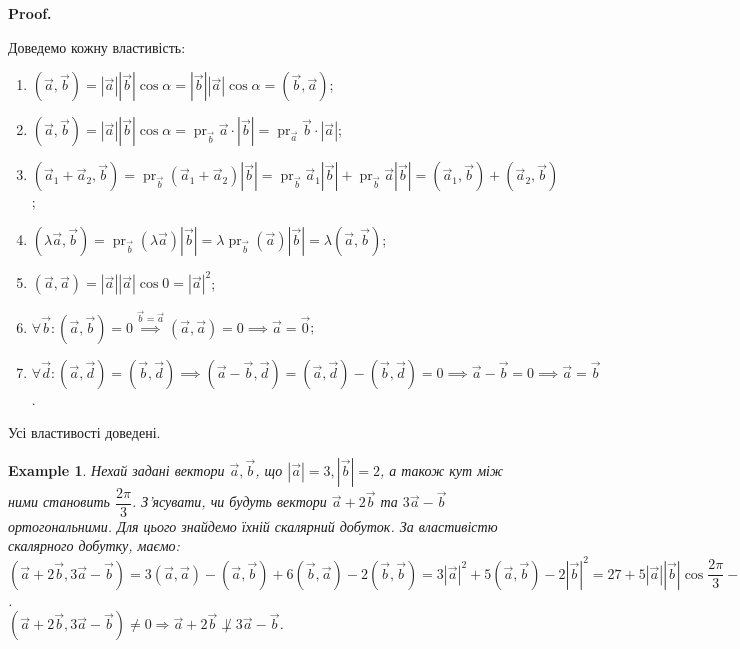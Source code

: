 \documentclass[a4paper, 10pt]{extarticle}
\makeatletter
\def\qed{$\blacksquare$}
\def\qed{$\blacksquare$}
\theoremstyle{theoremdd}
\theoremstyle{theoremdd}
\theoremstyle{theoremdd}
\theoremstyle{theoremdd}
\newtheorem{example}[theorem]{Example}
\theoremstyle{theoremdd}
\theoremstyle{theoremdd}
\theoremstyle{theoremdd}
\theoremstyle{theoremdd}
\renewenvironment{proof}[1][Proof.\\]{\par
\pushQED{\hfill \qed}%
\normalfont \topsep6\p@\@plus6\p@\relax
\trivlist
\item\relax
{\bfseries
#1\@addpunct{.}}\hspace\labelsep\ignorespaces
}{%
\popQED\endtrivlist\@endpefalse
}
\DeclareMathOperator{\pr}{pr}
\makeatother
\begin{document}
\begin{proof}
Доведемо кожну властивість:
\begin{enumerate}[wide=0pt,label={\arabic*)}]
	\item $(\vec{a}, \vec{b}) = |\vec{a}| |\vec{b}| \cos \alpha = |\vec{b}| |\vec{a}| \cos \alpha = (\vec{b}, \vec{a})$;
	\item $(\vec{a}, \vec{b}) = |\vec{a}| |\vec{b}| \cos \alpha = \pr_{\vec{b}} \vec{a} \cdot |\vec{b}| = \pr_{\vec{a}} \vec{b} \cdot |\vec{a}|$;
	\item $(\vec{a}_1+\vec{a}_2, \vec{b}) = \pr_{\vec{b}} (\vec{a}_1 + \vec{a}_2) |\vec{b}| = \pr_{\vec{b}} \vec{a}_1 |\vec{b}| + \pr_{\vec{b}} \vec{a} |\vec{b}| = (\vec{a}_1, \vec{b}) + (\vec{a}_2, \vec{b})$;
	\item $(\lambda \vec{a}, \vec{b}) = \pr_{\vec{b}} (\lambda \vec{a}) |\vec{b}| = \lambda \pr_{\vec{b}} (\vec{a}) |\vec{b}| = \lambda (\vec{a}, \vec{b})$;
	\item $(\vec{a}, \vec{a}) = |\vec{a}| |\vec{a}| \cos 0 = |\vec{a}|^2$;
	\item $\forall \vec{b}: (\vec{a}, \vec{b}) = 0 \overset{\vec{b} = \vec{a}}{\implies} (\vec{a}, \vec{a}) = 0 \implies \vec{a} = \vec{0}$;
	\item $\forall \vec{d}: (\vec{a}, \vec{d}) = (\vec{b}, \vec{d}) \implies (\vec{a}-\vec{b}, \vec{d}) = (\vec{a}, \vec{d}) - (\vec{b}, \vec{d}) = 0 \implies \vec{a} - \vec{b} = 0 \implies \vec{a} = \vec{b}$.
\end{enumerate}
Усі властивості доведені.
\end{proof}

\begin{example}
	Нехай задані вектори $\vec{a}, \vec{b}$, що $|\vec{a}| = 3, |\vec{b}| = 2$, а також кут між ними становить $\dfrac{2 \pi}{3}$. З'ясувати, чи будуть вектори $\vec{a}+2 \vec{b}$ та $3 \vec{a} - \vec{b}$ ортогональними.
	Для цього знайдемо їхній скалярний добуток.
	За властивістю скалярного добутку, маємо:\\
	$(\vec{a} + 2 \vec{b}, 3 \vec{a} - \vec{b}) = 3 (\vec{a}, \vec{a}) - (\vec{a}, \vec{b}) + 6 (\vec{b}, \vec{a}) - 2 (\vec{b}, \vec{b}) = 3 |\vec{a}|^2 + 5 (\vec{a}, \vec{b}) - 2 |\vec{b}|^2 = 27 + 5 |\vec{a}| |\vec{b}| \cos \dfrac{2 \pi}{3} - 8 = 4$.\\
	$(\vec{a} + 2 \vec{b}, 3 \vec{a} - \vec{b}) \neq 0 \Rightarrow \vec{a} + 2 \vec{b} \not\perp 3 \vec{a} - \vec{b}$.
\end{example}
\end{document}
